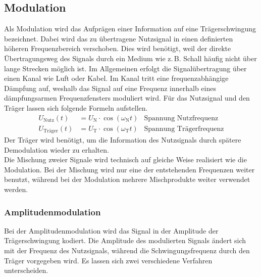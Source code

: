 \documentclass[a4paper,twoside,final]{article}
\begin{document}
\subsection{Modulation}
Als Modulation wird das Aufprägen einer Information auf eine Trägerschwingung bezeichnet. Dabei wird das zu übertragene Nutzsignal in einen definierten höheren Frequenzbereich verschoben. Dies wird benötigt, weil der direkte Übertragungsweg des Signals durch ein Medium wie z.\,B. Schall häufig nicht über lange Strecken möglich ist. Im Allgemeinen erfolgt die Signalübertragung über einen Kanal wie Luft oder Kabel. Im Kanal tritt eine frequenzabhängige Dämpfung auf, weshalb das Signal auf eine Frequenz innerhalb eines dämpfungsarmen Frequenzfensters moduliert wird. Für das Nutzsignal und den Träger lassen sich folgende Formeln aufstellen.
\begin{align}
    U_\text{Nutz}(t) &= U_\text{N}\cdot\cos(\omega_\text{N}t) & \text{Spannung Nutzfrequenz}\\
    U_\text{Träger}(t) &= U_\text{T}\cdot\cos(\omega_\text{T}t) & \text{Spannung Trägerfrequenz}
\end{align}
Der Träger wird benötigt, um die Information des Nutzsignals durch spätere Demodulation wieder zu erhalten.\\
Die Mischung zweier Signale wird technisch auf gleiche Weise realisiert wie die Modulation. Bei der Mischung wird nur eine der entstehenden Frequenzen weiter benutzt, während bei der Modulation mehrere Mischprodukte weiter verwendet werden.
\subsubsection{Amplitudenmodulation}
Bei der Amplitudenmodulation wird das Signal in der Amplitude der Trägerschwingung kodiert. Die Amplitude des modulierten Signals ändert sich mit der Frequenz des Nutzsignals, während die Schwingungsfrequenz durch den Träger vorgegeben wird. Es lassen sich zwei verschiedene Verfahren unterscheiden.
\end{document}
